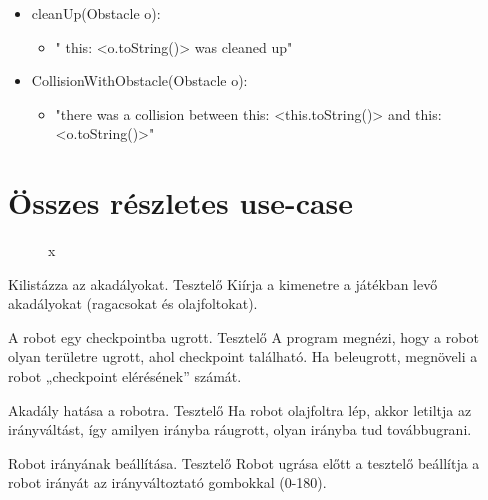 \begin{itemize}
\begin{itemize}
\begin{itemize}
	        \end{itemize}
	 \item cleanUp(Obstacle o):     
	        \begin{itemize}
	        \item  " this: <o.toString()> was cleaned up"
	        
	        \end{itemize}
\item CollisionWithObstacle(Obstacle o):     
	        \begin{itemize}
	        \item  "there was a collision between this: <this.toString()> and this: <o.toString()>"
	        
	        \end{itemize}
	        
	\end{itemize}
\end{itemize}

\section{Összes részletes use-case}

\begin{figure}[h]
\begin{center}
\caption{x}
\label{fig:ProtoUseCase}
\end{center}
\end{figure}

{Kilistázza az akadályokat.}
{Tesztelő}
{Kiírja a kimenetre a játékban levő akadályokat (ragacsokat és olajfoltokat).}

{A robot egy checkpointba ugrott.}
{Tesztelő}
{A program megnézi, hogy a robot olyan területre ugrott, ahol checkpoint található. Ha beleugrott, megnöveli a robot „checkpoint elérésének” számát.}

{Akadály hatása a robotra.}
{Tesztelő}
{Ha robot olajfoltra lép, akkor letiltja az irányváltást, így amilyen irányba ráugrott, olyan irányba tud továbbugrani.}

{Robot irányának beállítása.}
{Tesztelő}
{Robot ugrása előtt a tesztelő beállítja a robot irányát az irányváltoztató gombokkal (0-180).}

